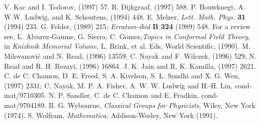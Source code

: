 \begin{thebibliography}{99}
V. Kac and I. Todorov,  (1997) 57.
  R. Dijkgraaf,  (1997) 588. 
   P. Bouwknegt, A. W.W. Ludwig,
                and K. Schoutens,  (1994) 448. 
E. Melzer, {\it Lett. Math. Phys.} {\bf 31} (1994) 233.
G. Felder,  (1989) 215; {\it Erratum-ibid}
                {\bf B 324} (1989) 548. For a review see, L. Alvarez-Gaume, G.
                Sierra, C. Gomez,{\it Topics in Conformal Field Theory},
                in {\it Knizhnik Memorial Volume}, L. Brink, et al. Eds, 
                World Scientific, (1990).
M. Milovanovi\'c and N. Read,  (1996) 13559;
                C. Nayak and F. Wilczek,  (1996) 529;
                N. Read and R. H. Rezayi,  (1996) 16864.
  J. K. Jain and R. K. Kamilla,  (1997) 2621. 
 C. de C. Chamon, D. E. Freed, S. A. Kivelson, S. L. Sondhi 
                and X. G. Wen,  (1997) 2331; 
                C. Nayak, M. P. A. Fisher, A. W. W. Ludwig and H.-H. Lin,
                cond-mat/9710305.                                
 N. P. Sandler, C. de C. Chamon and E. Fradkin,
                cond-mat/9704189.
   B. G. Wybourne, {\it Classical Groups for Physicists}, 
                Wiley, New York (1974).
  S. Wolfram, {\it Mathematica, } Addison-Wesley, New York (1991).
\end{thebibliography}




